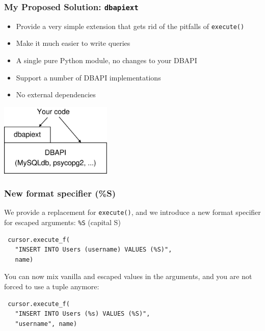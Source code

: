 \documentclass{beamer}
\begin{document}
\begin{frame}[fragile]
  \frametitle{My Proposed Solution: \texttt{dbapiext}}

  \begin{itemize}
  \item Provide a very simple extension that gets rid of the pitfalls of
    \texttt{execute()}
  \item Make it much easier to write queries
  \item A single pure Python module, no changes to your DBAPI
  \item Support a number of DBAPI implementations
  \item No external dependencies
  \end{itemize}

  \begin{center}
    \includegraphics[width=0.4\textwidth]{fig-layer.pdf}
  \end{center}

\end{frame}



\begin{frame}[fragile]
  \frametitle{New format specifier (\%S)}

  We provide a replacement for \texttt{execute()}, and we introduce a new format
  specifier for escaped arguments: \texttt{\%S} (capital S)

\begin{verbatim}
 cursor.execute_f(
   "INSERT INTO Users (username) VALUES (%S)",
   name)
\end{verbatim}

  You can now mix vanilla and escaped values in the arguments, and you are not
  forced to use a tuple anymore:
\begin{verbatim}
 cursor.execute_f(
   "INSERT INTO Users (%s) VALUES (%S)",
   "username", name)
\end{verbatim}

\end{frame}
\end{document}
